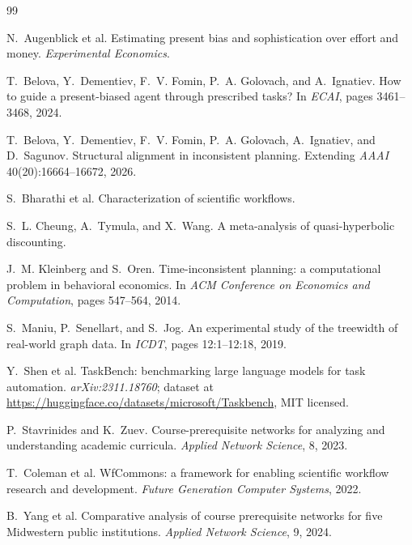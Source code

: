 \documentclass[10pt]{article}
\begin{document}
\begin{thebibliography}{99}

N.~Augenblick et al.
\newblock Estimating present bias and sophistication over effort and money.
\newblock \emph{Experimental Economics}.

T.~Belova, Y.~Dementiev, F.~V. Fomin, P.~A. Golovach, and A.~Ignatiev.
\newblock How to guide a present-biased agent through prescribed tasks?
\newblock In \emph{ECAI}, pages 3461--3468, 2024.

T.~Belova, Y.~Dementiev, F.~V. Fomin, P.~A. Golovach, A.~Ignatiev, and D.~Sagunov.
\newblock Structural alignment in inconsistent planning.
\newblock Extending \emph{AAAI} 40(20):16664--16672, 2026.

S.~Bharathi et al.
\newblock Characterization of scientific workflows.

S.~L. Cheung, A.~Tymula, and X.~Wang.
\newblock A meta-analysis of quasi-hyperbolic discounting.

J.~M. Kleinberg and S.~Oren.
\newblock Time-inconsistent planning: a computational problem in behavioral
economics.
\newblock In \emph{ACM Conference on Economics and Computation}, pages 547--564,
2014.

S.~Maniu, P.~Senellart, and S.~Jog.
\newblock An experimental study of the treewidth of real-world graph data.
\newblock In \emph{ICDT}, pages 12:1--12:18, 2019.

Y.~Shen et al.
\newblock TaskBench: benchmarking large language models for task automation.
\newblock \emph{arXiv:2311.18760}; dataset at
\url{https://huggingface.co/datasets/microsoft/Taskbench}, MIT licensed.

P.~Stavrinides and K.~Zuev.
\newblock Course-prerequisite networks for analyzing and understanding academic
curricula.
\newblock \emph{Applied Network Science}, 8, 2023.

T.~Coleman et al.
\newblock WfCommons: a framework for enabling scientific workflow research and
development.
\newblock \emph{Future Generation Computer Systems}, 2022.

B.~Yang et al.
\newblock Comparative analysis of course prerequisite networks for five Midwestern
public institutions.
\newblock \emph{Applied Network Science}, 9, 2024.

\end{thebibliography}
\end{document}
